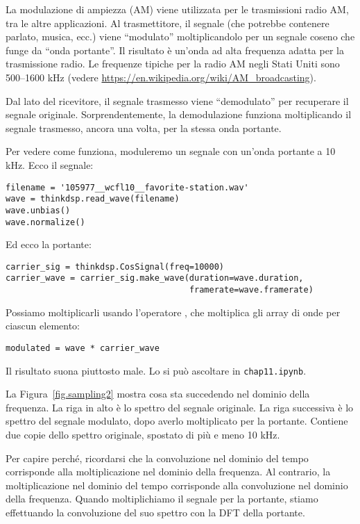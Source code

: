 \documentclass[12pt,a4paper]{book}
\begin{document}
La modulazione di ampiezza (AM) viene utilizzata per le trasmissioni radio AM, tra le altre applicazioni. Al trasmettitore, il segnale (che potrebbe contenere parlato, musica, ecc.) viene ``modulato'' moltiplicandolo per un segnale coseno che funge da ``onda portante''. Il risultato è un'onda ad alta frequenza adatta per la trasmissione radio. Le frequenze tipiche per la radio AM negli Stati Uniti sono 500--1600 kHz (vedere \url{https://en.wikipedia.org/wiki/AM_broadcasting}).

Dal lato del ricevitore, il segnale trasmesso viene ``demodulato'' per recuperare il segnale originale. Sorprendentemente, la demodulazione funziona moltiplicando il segnale trasmesso, ancora una volta, per la stessa onda portante.

Per vedere come funziona, moduleremo un segnale con un'onda portante a 10 kHz. Ecco il segnale:

\begin{verbatim} 
filename = '105977__wcfl10__favorite-station.wav'
wave = thinkdsp.read_wave(filename)
wave.unbias()
wave.normalize()
 \end{verbatim} 

Ed ecco la portante:

\begin{verbatim} 
carrier_sig = thinkdsp.CosSignal(freq=10000)
carrier_wave = carrier_sig.make_wave(duration=wave.duration,
                                     framerate=wave.framerate)
 \end{verbatim} 

Possiamo moltiplicarli usando l'operatore {\tt *}, che moltiplica gli array di onde per ciascun elemento:

\begin{verbatim} 
modulated = wave * carrier_wave
 \end{verbatim} 

Il risultato suona piuttosto male. Lo si può ascoltare in {\tt chap11.ipynb}.

La Figura~\ref{fig.sampling2} mostra cosa sta succedendo nel dominio della frequenza. La riga in alto è lo spettro del segnale originale. La riga successiva è lo spettro del segnale modulato, dopo averlo moltiplicato per la portante. Contiene due copie dello spettro originale, spostato di più e meno 10 kHz.

Per capire perché, ricordarsi che la convoluzione nel dominio del tempo corrisponde alla moltiplicazione nel dominio della frequenza. Al contrario, la moltiplicazione nel dominio del tempo corrisponde alla convoluzione nel dominio della frequenza. Quando moltiplichiamo il segnale per la portante, stiamo effettuando la convoluzione del suo spettro con la DFT della portante.
\end{document}
